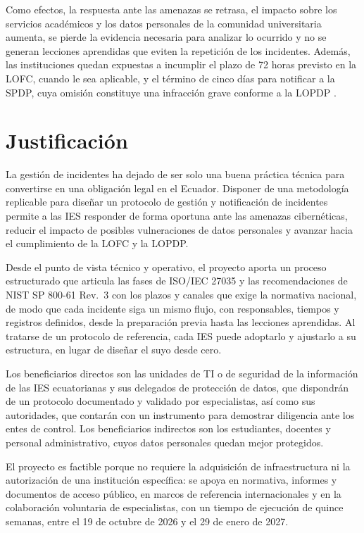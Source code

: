 Como efectos, la respuesta ante las amenazas se retrasa, el impacto sobre los servicios académicos y los datos personales de la comunidad universitaria aumenta, se pierde la evidencia necesaria para analizar lo ocurrido y no se generan lecciones aprendidas que eviten la repetición de los incidentes. Además, las instituciones quedan expuestas a incumplir el plazo de 72 horas previsto en la LOFC, cuando le sea aplicable, y el término de cinco días para notificar a la SPDP, cuya omisión constituye una infracción grave conforme a la LOPDP \cite{lofc2026,spdp2026norma}.

\section{Justificación}
La gestión de incidentes ha dejado de ser solo una buena práctica técnica para convertirse en una obligación legal en el Ecuador. Disponer de una metodología replicable para diseñar un protocolo de gestión y notificación de incidentes permite a las IES responder de forma oportuna ante las amenazas cibernéticas, reducir el impacto de posibles vulneraciones de datos personales y avanzar hacia el cumplimiento de la LOFC y la LOPDP.

Desde el punto de vista técnico y operativo, el proyecto aporta un proceso estructurado que articula las fases de ISO/IEC 27035 \cite{iso27035_2023} y las recomendaciones de NIST SP 800-61 Rev.~3 \cite{nist80061r3} con los plazos y canales que exige la normativa nacional, de modo que cada incidente siga un mismo flujo, con responsables, tiempos y registros definidos, desde la preparación previa hasta las lecciones aprendidas. Al tratarse de un protocolo de referencia, cada IES puede adoptarlo y ajustarlo a su estructura, en lugar de diseñar el suyo desde cero.

Los beneficiarios directos son las unidades de TI o de seguridad de la información de las IES ecuatorianas y sus delegados de protección de datos, que dispondrán de un protocolo documentado y validado por especialistas, así como sus autoridades, que contarán con un instrumento para demostrar diligencia ante los entes de control. Los beneficiarios indirectos son los estudiantes, docentes y personal administrativo, cuyos datos personales quedan mejor protegidos.

El proyecto es factible porque no requiere la adquisición de infraestructura ni la autorización de una institución específica: se apoya en normativa, informes y documentos de acceso público, en marcos de referencia internacionales y en la colaboración voluntaria de especialistas, con un tiempo de ejecución de quince semanas, entre el 19 de octubre de 2026 y el 29 de enero de 2027.


